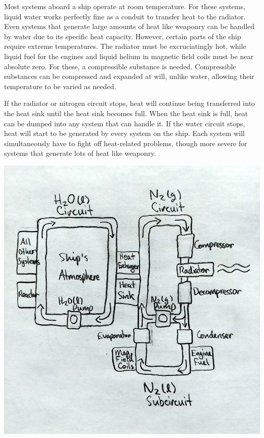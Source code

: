 \documentclass[a4paper]{article}
\begin{document}
Most systems aboard a ship operate at room temperature. For these systems, liquid water works perfectly fine as a conduit to transfer heat to the radiator. Even systems that generate large amounts of heat like weaponry can be handled by water due to its specific heat capacity. However, certain parts of the ship require extreme temperatures. The radiator must be excruciatingly hot, while liquid fuel for the engines and liquid helium in magnetic field coils must be near absolute zero. For these, a compressible substance is needed. Compressible substances can be compressed and expanded at will, unlike water, allowing their temperature to be varied as needed.

If the radiator or nitrogen circuit stops, heat will continue being transferred into the heat sink until the heat sink becomes full. When the heat sink is full, heat can be dumped into any system that can handle it. If the water circuit stops, heat will start to be generated by every system on the ship. Each system will simultaneously have to fight off heat-related problems, though more severe for systems that generate lots of heat like weaponry.

\vspace{0.2cm}
\includegraphics[scale=0.275]{Thermal}
\end{document}
